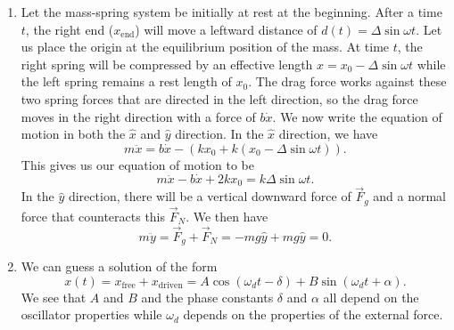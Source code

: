 \begin{sol}
\begin{enumerate}[label=\textbf{(\alph*)}]
\item Let the mass-spring system be initially at rest at the beginning. After a time $t$, the right end ($x_\text{end}$) will move a leftward distance of $d(t) = \Delta \sin \omega t$. Let us place the origin at the equilibrium position of the mass. At time $t$, the right spring will be compressed by an effective length $x = x_0 - \Delta \sin \omega t$ while the left spring remains a rest length of $x_0$. The drag force works against these two spring forces that are directed in the left direction, so the drag force moves in the right direction with a force of $b\dot{x}$. We now write the equation of motion in both the $\hat{x}$ and $\hat{y}$ direction. In the $\hat{x}$ direction, we have 
\[m\ddot{x} = b\dot{x} - (kx_0 + k(x_0 - \Delta \sin\omega t)).\]
This gives us our equation of motion to be 
\[\boxed{m\ddot{x} - b\dot{x} + 2kx_0 = k\Delta \sin \omega t}.\]
In the $\hat{y}$ direction, there will be a vertical downward force of $\vec{F}_g$ and a normal force that counteracts this $\vec{F}_N$. We then have 
\[m\ddot{y} = \vec{F}_g + \vec{F}_N = -mg\hat{y} + mg\hat{y} = 0.\]

\item We can guess a solution of the form 
\[x(t) = x_{\text{free}} + x_{\text{driven}} = A\cos (\omega_d t - \delta) + B \sin (\omega_d t + \alpha).\]
We see that $A$ and $B$ and the phase constants $\delta$ and $\alpha$ all depend on the oscillator properties while $\omega_d$ depends on the properties of the external force.  
\end{enumerate}

\end{sol}